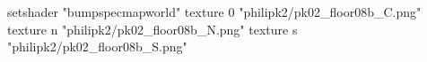 setshader "bumpspecmapworld"
    texture 0 "philipk2/pk02_floor08b_C.png"
    texture n "philipk2/pk02_floor08b_N.png"
    texture s "philipk2/pk02_floor08b_S.png"